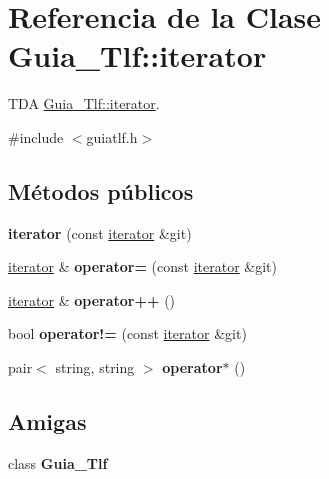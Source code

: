 \hypertarget{classGuia__Tlf_1_1iterator}{}\section{Referencia de la Clase Guia\+\_\+\+Tlf\+:\+:iterator}
\label{classGuia__Tlf_1_1iterator}


T\+DA \hyperlink{classGuia__Tlf_1_1iterator}{Guia\+\_\+\+Tlf\+::iterator}.  




{\ttfamily \#include $<$guiatlf.\+h$>$}

\subsection*{Métodos públicos}
\begin{DoxyCompactItemize}
\item 
\mbox{\label{classGuia__Tlf_1_1iterator_ae7c89ef51b42964461e1647a4c2b9c7e}} 
{\bfseries iterator} (const \hyperlink{classGuia__Tlf_1_1iterator}{iterator} \&git)
\item 
\mbox{\label{classGuia__Tlf_1_1iterator_ad6f223a60ea3595ecb2d7e236549de9e}} 
\hyperlink{classGuia__Tlf_1_1iterator}{iterator} \& {\bfseries operator=} (const \hyperlink{classGuia__Tlf_1_1iterator}{iterator} \&git)
\item 
\mbox{\label{classGuia__Tlf_1_1iterator_a4edb22003e51ce05bb2be0e0f0f9334d}} 
\hyperlink{classGuia__Tlf_1_1iterator}{iterator} \& {\bfseries operator++} ()
\item 
\mbox{\label{classGuia__Tlf_1_1iterator_a535ca8111fd6a22627f8d2c941c931af}} 
bool {\bfseries operator!=} (const \hyperlink{classGuia__Tlf_1_1iterator}{iterator} \&git)
\item 
\mbox{\label{classGuia__Tlf_1_1iterator_a75218dfa6eb12a59144d6c1699575820}} 
pair$<$ string, string $>$ {\bfseries operator$\ast$} ()
\end{DoxyCompactItemize}
\subsection*{Amigas}
\begin{DoxyCompactItemize}
\item 
\mbox{\label{classGuia__Tlf_1_1iterator_a4349d7a1b26a0aa94447235f95b2f940}} 
class {\bfseries Guia\+\_\+\+Tlf}
\end{DoxyCompactItemize}


